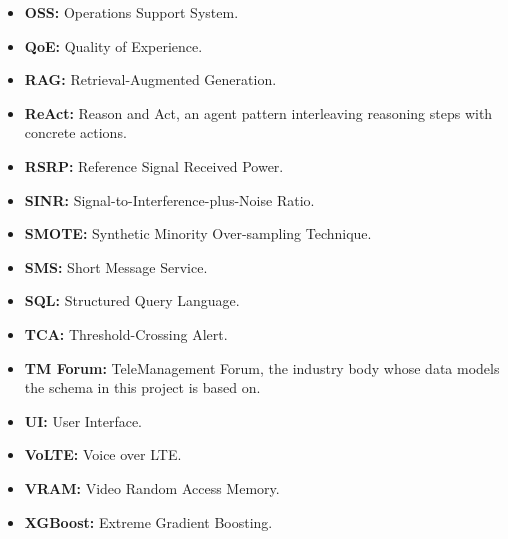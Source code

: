 \begin{itemize}
    \item \textbf{OSS:} Operations Support System.
    \item \textbf{QoE:} Quality of Experience.
    \item \textbf{RAG:} Retrieval-Augmented Generation.
    \item \textbf{ReAct:} Reason and Act, an agent pattern interleaving reasoning steps
    with concrete actions.
    \item \textbf{RSRP:} Reference Signal Received Power.
    \item \textbf{SINR:} Signal-to-Interference-plus-Noise Ratio.
    \item \textbf{SMOTE:} Synthetic Minority Over-sampling Technique.
    \item \textbf{SMS:} Short Message Service.
    \item \textbf{SQL:} Structured Query Language.
    \item \textbf{TCA:} Threshold-Crossing Alert.
    \item \textbf{TM Forum:} TeleManagement Forum, the industry body whose data models
    the schema in this project is based on.
    \item \textbf{UI:} User Interface.
    \item \textbf{VoLTE:} Voice over LTE.
    \item \textbf{VRAM:} Video Random Access Memory.
    \item \textbf{XGBoost:} Extreme Gradient Boosting.
\end{itemize}
